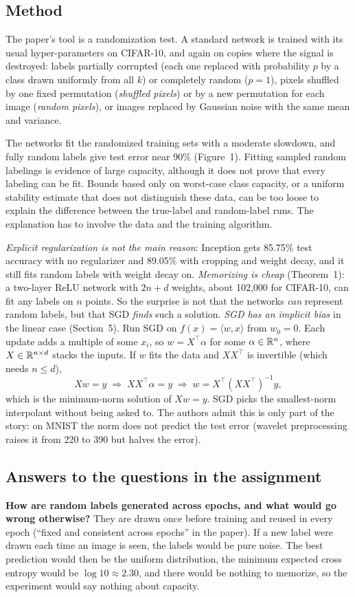 \subsection{Method}
The paper's tool is a randomization test. A standard network is trained with its usual hyper-parameters on CIFAR-10, and again on copies where the signal is destroyed: labels partially corrupted (each one replaced with probability $p$ by a class drawn uniformly from all $k$) or completely random ($p=1$), pixels shuffled by one fixed permutation (\emph{shuffled pixels}) or by a new permutation for each image (\emph{random pixels}), or images replaced by Gaussian noise with the same mean and variance.

The networks fit the randomized training sets with a moderate slowdown, and fully random labels give test error near 90\% (Figure~1). Fitting sampled random labelings is evidence of large capacity, although it does not prove that every labeling can be fit. Bounds based only on worst-case class capacity, or a uniform stability estimate that does not distinguish these data, can be too loose to explain the difference between the true-label and random-label runs. The explanation has to involve the data and the training algorithm.

\emph{Explicit regularization is not the main reason}: Inception gets 85.75\% test accuracy with no regularizer and 89.05\% with cropping and weight decay, and it still fits random labels with weight decay on. \emph{Memorizing is cheap} (Theorem~1): a two-layer ReLU network with $2n+d$ weights, about 102{,}000 for CIFAR-10, can fit any labels on $n$ points. So the surprise is not that the networks \emph{can} represent random labels, but that SGD \emph{finds} such a solution. \emph{SGD has an implicit bias} in the linear case (Section~5). Run SGD on $f(x)=\langle w,x\rangle$ from $w_0=0$. Each update adds a multiple of some $x_i$, so $w=X^\top\alpha$ for some $\alpha\in\mathbb{R}^n$, where $X\in\mathbb{R}^{n\times d}$ stacks the inputs. If $w$ fits the data and $XX^\top$ is invertible (which needs $n\le d$),
\[
  Xw=y \;\Rightarrow\; XX^\top\alpha=y \;\Rightarrow\; w=X^\top(XX^\top)^{-1}y,
\]
which is the minimum-norm solution of $Xw=y$. SGD picks the smallest-norm interpolant without being asked to. The authors admit this is only part of the story: on MNIST the norm does not predict the test error (wavelet preprocessing raises it from 220 to 390 but halves the error).

\subsection{Answers to the questions in the assignment}
\textbf{How are random labels generated across epochs, and what would go wrong otherwise?} They are drawn once before training and reused in every epoch (``fixed and consistent across epochs'' in the paper). If a new label were drawn each time an image is seen, the labels would be pure noise. The best prediction would then be the uniform distribution, the minimum expected cross entropy would be $\log 10\approx2.30$, and there would be nothing to memorize, so the experiment would say nothing about capacity.

